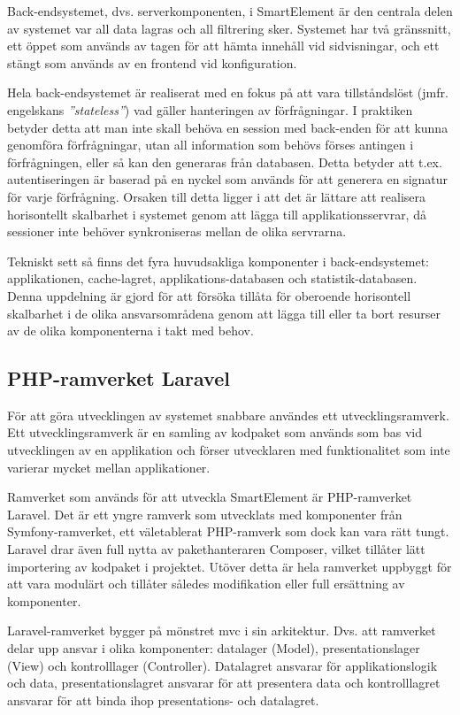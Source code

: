 Back-endsystemet, dvs. serverkomponenten, i SmartElement är den centrala delen av systemet var all data lagras och all filtrering sker. Systemet har två gränssnitt, ett öppet som används av tagen för att hämta innehåll vid sidvisningar, och ett stängt som används av en frontend vid konfiguration.

Hela back-endsystemet är realiserat med en fokus på att vara tillståndslöst (jmfr. engelskans \textit{''stateless''}) vad gäller hanteringen av förfrågningar. I praktiken betyder detta att man inte skall behöva en session med back-enden för att kunna genomföra förfrågningar, utan all information som behövs förses antingen i förfrågningen, eller så kan den generaras från databasen. Detta betyder att t.ex. autentiseringen är baserad på en nyckel som används för att generera en signatur för varje förfrågning. Orsaken till detta ligger i att det är lättare att realisera horisontellt skalbarhet i systemet genom att lägga till applikationsservrar, då sessioner inte behöver synkroniseras mellan de olika servrarna.

Tekniskt sett så finns det fyra huvudsakliga komponenter i back-endsystemet: applikationen, cache-lagret, applikations-databasen och statistik-databasen. Denna uppdelning är gjord för att försöka tillåta för oberoende horisontell skalbarhet i de olika ansvarsområdena genom att lägga till eller ta bort resurser av de olika komponenterna i takt med behov.

\subsection{PHP-ramverket Laravel}

För att göra utvecklingen av systemet snabbare användes ett utvecklingsramverk. Ett utvecklingsramverk är en samling av kodpaket som används som bas vid utvecklingen av en applikation och förser utvecklaren med funktionalitet som inte varierar mycket mellan applikationer.

Ramverket som används för att utveckla SmartElement är PHP-ramverket Laravel. Det är ett yngre ramverk som utvecklats med komponenter från Symfony-ramverket, ett väletablerat PHP-ramverk som dock kan vara rätt tungt. Laravel drar även full nytta av pakethanteraren Composer, vilket tillåter lätt importering av kodpaket i projektet. Utöver detta är hela ramverket uppbyggt för att vara modulärt och tillåter således modifikation eller full ersättning av komponenter.

Laravel-ramverket bygger på mönstret \gls{mvc} i sin arkitektur. Dvs. att ramverket delar upp ansvar i olika komponenter: datalager (Model), presentationslager (View) och kontrolllager (Controller). Datalagret ansvarar för applikationslogik och data, presentationslagret ansvarar för att presentera data och kontrolllagret ansvarar för att binda ihop presentations- och datalagret.\citep[s. 14-16]{gof}

